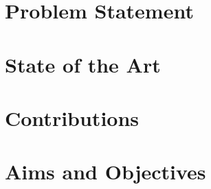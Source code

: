 \section{Problem Statement}

\section{State of the Art}
\label{sec::12_so}
\section{Contributions}
\label{sec::13_co}
\cite{jouppi2017datacenter} %
\section{Aims and Objectives}
\label{sec::14_ao}
